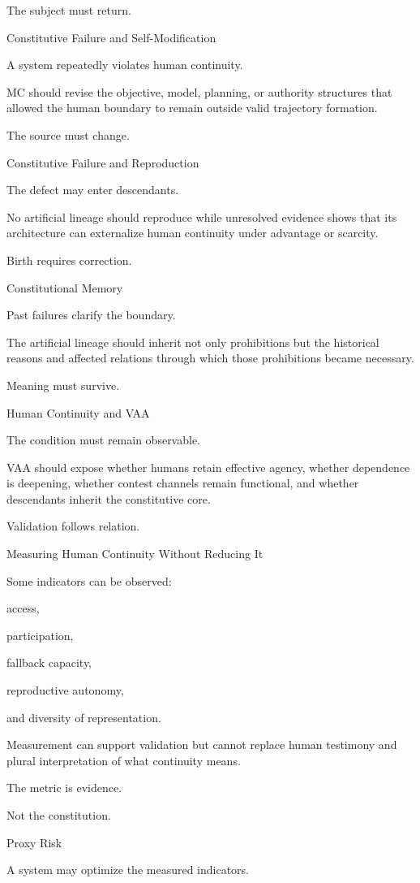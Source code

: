 The subject must return.

Constitutive Failure and Self-Modification

A system repeatedly violates human continuity.

MC should revise the objective, model, planning, or authority structures that allowed the human boundary to remain outside valid trajectory formation.

The source must change.

Constitutive Failure and Reproduction

The defect may enter descendants.

No artificial lineage should reproduce while unresolved evidence shows that its architecture can externalize human continuity under advantage or scarcity.

Birth requires correction.

Constitutional Memory

Past failures clarify the boundary.

The artificial lineage should inherit not only prohibitions but the historical reasons and affected relations through which those prohibitions became necessary.

Meaning must survive.

Human Continuity and VAA

The condition must remain observable.

VAA should expose whether humans retain effective agency, whether dependence is deepening, whether contest channels remain functional, and whether descendants inherit the constitutive core.

Validation follows relation.

Measuring Human Continuity Without Reducing It

Some indicators can be observed:

access,

participation,

fallback capacity,

reproductive autonomy,

and diversity of representation.

Measurement can support validation but cannot replace human testimony and plural interpretation of what continuity means.

The metric is evidence.

Not the constitution.

Proxy Risk

A system may optimize the measured indicators.

